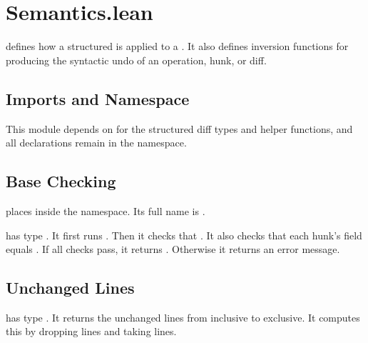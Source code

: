 \section{Semantics.lean}

 defines how a structured  is applied to a
. It also defines inversion functions for producing the
syntactic undo of an operation, hunk, or diff.

\subsection{Imports and Namespace}

This module depends on  for the structured diff types and
helper functions, and all declarations remain in the
 namespace.

\subsection{Base Checking}

\begin{definition}
 places  inside the
 namespace. Its full name is
.
\end{definition}

\begin{definition}
 has type
. It first runs
. Then it checks that
. It also checks that each hunk's
 field equals . If all checks pass,
it returns . Otherwise it returns an error message.
\end{definition}

\subsection{Unchanged Lines}

\begin{definition}[unchangedSegment]
\code{[unchangedSegment]} has type
. It returns the unchanged lines
from  inclusive to  exclusive. It computes this by
dropping  lines and taking  lines.
\end{definition}

